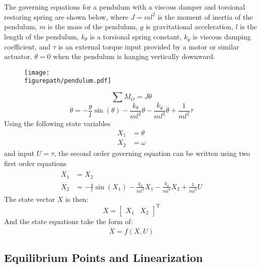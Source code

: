 The governing equations for a pendulum with a viscous damper and torsional restoring spring are shown below, where $J=ml^2$ is the moment of inertia of the pendulum, $m$ is the mass of the pendulum, $g$ is gravitational acceleration, $l$ is the length of the pendulum, $k_{\theta}$ is a torsional spring constant, $k_{\dot{\theta}}$ is viscous damping coefficient, and $\tau$ is an external torque input provided by a motor or similar actuator.
$\theta=0$ when the pendulum is hanging vertically downward.
\begin{figure}[H]
  \begin{center}
    \texttt{[image: \\figurepath/pendulum.pdf]}
  \end{center}
\end{figure}
\begin{equation*}
  \sum M_{O}=J\ddot{\theta}
\end{equation*}
\begin{equation*}
  \ddot{\theta}=-\frac{g}{l}\sin(\theta)-\frac{k_{\theta}}{ml^{2}}\theta-\frac{k_{\dot{\theta}}}{ml^{2}}\dot{\theta}+\frac{1}{ml^{2}}\tau
\end{equation*}
Using the following state variables
\begin{equation*}
  \begin{split}
    X_1&=\theta \\
    X_2&=\omega
  \end{split}
\end{equation*}
and input $U=\tau$, the second order governing equation can be written using two first order equations
\begin{equation*}
  \begin{split}
    \dot{X_1}&=X_2 \\
    \dot{X_2}&=-\frac{g}{l}\sin(X_1)-\frac{k_{\theta}}{ml^2}X_1-\frac{k_{\dot{\theta}}}{ml^2}X_2+\frac{1}{ml^2}U
  \end{split}
\end{equation*}
The state vector $X$ is then:
\begin{equation*}
  X=\begin{bmatrix} X_1 & X_2 \end{bmatrix}^{\text{T}}
\end{equation*}
And the state equations take the form of:
\begin{equation*}
  \dot{X}=f(X,U)
\end{equation*}

\subsection{Equilibrium Points and Linearization}

